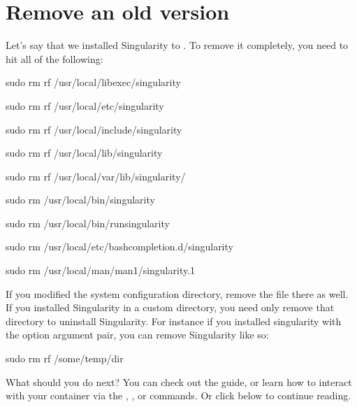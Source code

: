 \documentclass[letterpaper,10pt,english]{sphinxmanual}
\begin{document}
\section{Remove an old version}
\label{\detokenize{installation:remove-an-old-version}}
Let’s say that we installed Singularity to . To remove it completely,
you need to hit all of the following:

%
\begin{sphinxVerbatim}[commandchars=\\\{\}]
\PYGZdl{} sudo rm \PYGZhy{}rf /usr/local/libexec/singularity

\PYGZdl{} sudo rm \PYGZhy{}rf /usr/local/etc/singularity

\PYGZdl{} sudo rm \PYGZhy{}rf /usr/local/include/singularity

\PYGZdl{} sudo rm \PYGZhy{}rf /usr/local/lib/singularity

\PYGZdl{} sudo rm \PYGZhy{}rf /usr/local/var/lib/singularity/

\PYGZdl{} sudo rm /usr/local/bin/singularity

\PYGZdl{} sudo rm /usr/local/bin/run\PYGZhy{}singularity

\PYGZdl{} sudo rm /usr/local/etc/bash\PYGZus{}completion.d/singularity

\PYGZdl{} sudo rm /usr/local/man/man1/singularity.1
\end{sphinxVerbatim}

If you modified the system configuration directory, remove the  file
there as well.
If you installed Singularity in a custom directory, you need only
remove that directory to uninstall Singularity. For instance if you
installed singularity with the  option argument pair, you can remove
Singularity like so:

%
\begin{sphinxVerbatim}[commandchars=\\\{\}]
\PYGZdl{} sudo rm \PYGZhy{}rf /some/temp/dir
\end{sphinxVerbatim}

What should you do next? You can check out the {\hyperref[\detokenize{quick_start:quick-start}]{}} guide, or learn how to
interact with your container via the {\hyperref[\detokenize{appendix:shell-command}]{}} , {\hyperref[\detokenize{appendix:exec-command}]{}} , or {\hyperref[\detokenize{appendix:run-command}]{}} commands. Or click 
below to continue reading.
\end{document}
